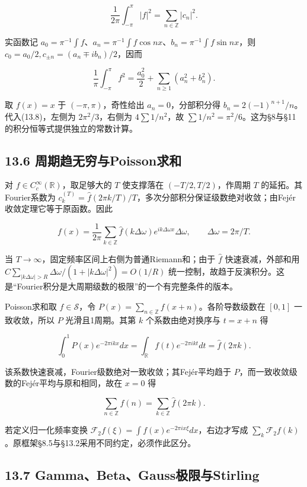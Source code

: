 \documentclass[11pt,a4paper]{article}
\begin{document}
\[
\frac1{2\pi}\int_{-\pi}^\pi|f|^2=\sum_{n\in\mathbb Z}|c_n|^2.
\]

实函数记
\(a_0=\pi^{-1}\int f\)、\(a_n=\pi^{-1}\int f\cos nx\)、\(b_n=\pi^{-1}\int f\sin nx\)，则
\(c_0=a_0/2,c_{\pm n}=(a_n\mp ib_n)/2\)，因而

\[
\frac1\pi\int_{-\pi}^\pi f^2=\frac{a_0^2}{2}+\sum_{n\ge1}(a_n^2+b_n^2).\tag{13.8}
\]

取 \(f(x)=x\) 于 \((-\pi,\pi)\)，奇性给出 \(a_n=0\)，分部积分得
\(b_n=2(-1)^{n+1}/n\)。代入(13.8)，左侧为 \(2\pi^2/3\)，右侧为
\(4\sum1/n^2\)，故
\(\sum1/n^2=\pi^2/6\)。这为§8与§11的积分恒等式提供独立的常数计算。

\subsection{13.6
周期趋无穷与Poisson求和}\label{ux5468ux671fux8d8bux65e0ux7a77ux4e0epoissonux6c42ux548c}

对 \(f\in C_c^\infty(\mathbb R)\)，取足够大的 \(T\) 使支撑落在
\((-T/2,T/2)\)，作周期 \(T\) 的延拓。其Fourier系数为
\(c_k^{(T)}=\widehat f(2\pi k/T)/T\)，多次分部积分保证级数绝对收敛；由Fejér收敛定理它等于原函数。因此

\[
f(x)=\frac1{2\pi}\sum_{k\in\mathbb Z}\widehat f(k\Delta\omega)
 e^{ik\Delta\omega x}\Delta\omega,\qquad \Delta\omega=2\pi/T.
\]

当 \(T\to\infty\)，固定频率区间上右侧为普通Riemann和；由于
\(\widehat f\) 快速衰减，外部和用
\(C\sum_{|k\Delta\omega|>R}\Delta\omega/(1+|k\Delta\omega|^2)=O(1/R)\)
统一控制，故趋于反演积分。这是``Fourier积分是大周期级数的极限''的一个有完整条件的版本。

Poisson求和取 \(f\in\mathcal S\)，令
\(P(x)=\sum_{n\in\mathbb Z}f(x+n)\)。各阶导数级数在 \([0,1]\)
一致收敛，所以 \(P\) 光滑且1周期。其第 \(k\) 个系数由绝对换序与
\(t=x+n\) 得

\[
\int_0^1P(x)e^{-2\pi ikx}dx
=\int_{\mathbb R}f(t)e^{-2\pi ikt}dt=\widehat f(2\pi k).
\]

该系数快速衰减，Fourier级数绝对一致收敛；其Fejér平均趋于
\(P\)，而一致收敛级数的Fejér平均与原和相同，故在 \(x=0\) 得

\[
\sum_{n\in\mathbb Z}f(n)=\sum_{k\in\mathbb Z}\widehat f(2\pi k).\tag{13.9}
\]

若定义归一化频率变换
\(\mathcal F_2f(\xi)=\int f(x)e^{-2\pi ix\xi}dx\)，右边才写成
\(\sum_k\mathcal F_2f(k)\)。原框架§8.5与§13.2采用不同约定，必须作此区分。

\subsection{13.7
Gamma、Beta、Gauss极限与Stirling}\label{gammabetagaussux6781ux9650ux4e0estirling}
\end{document}
